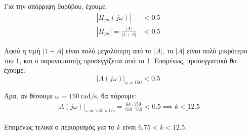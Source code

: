 \documentclass[11pt,a4paper,notitlepage,fleqn]{article}
\begin{document}
\begin{exercise}
Για την απόρριψη θορύβου, έχουμε:
\begin{align*}
	\left|H_{yn}(j\omega )\right| &< 0.5 \\
	\left|H_{yn}\right| = \frac{|A|}{|1+A|} &< 0.5
\end{align*}

Αφού η τιμή \( |1+A| \) είναι πολύ μεγαλύτερη από το \( |A| \), το \( |Α| \) είναι πολύ
μικρότερο του 1, και ο παρονομαστής προσεγγίζεται από το 1. Επομένως, προσεγγιστικά θα
έχουμε:
\[
\left|A(j\omega )\right|_{\omega =150} < 0.5
\]

Άρα, αν θέσουμε \( \omega = \SI{150}{\radian/\second} \), θα πάρουμε:
\begin{gather*}
	\left|A(j\omega )\right|_{\omega=\SI{150}{\radian/\second}}
	= \frac{6k\cdot 150}{150\cdot 150} < 0.5 \implies \underline{k < 12.5}
\end{gather*}

Επομένως τελικά ο περιορισμός για το \( k \) είναι \( 6.75 < k < 12.5 \).

\end{exercise}
\end{document}
